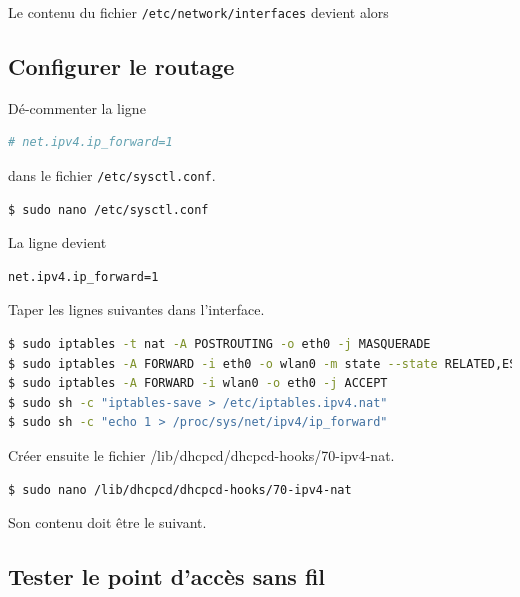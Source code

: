 \documentclass[11pt]{article}
\begin{document}
Le contenu du fichier \lstinline{/etc/network/interfaces} devient alors



\subsection{Configurer le routage}

Dé-commenter la ligne 
\begin{lstlisting}[language=bash]
# net.ipv4.ip_forward=1
\end{lstlisting}
dans le fichier \lstinline{/etc/sysctl.conf}.

\begin{lstlisting}[language=bash]
$ sudo nano /etc/sysctl.conf
\end{lstlisting}

La ligne devient
\begin{lstlisting}[language=bash]
net.ipv4.ip_forward=1
\end{lstlisting}

Taper les lignes suivantes dans l'interface.

\begin{lstlisting}[language=bash]
$ sudo iptables -t nat -A POSTROUTING -o eth0 -j MASQUERADE
$ sudo iptables -A FORWARD -i eth0 -o wlan0 -m state --state RELATED,ESTABLISHED -j ACCEPT
$ sudo iptables -A FORWARD -i wlan0 -o eth0 -j ACCEPT
$ sudo sh -c "iptables-save > /etc/iptables.ipv4.nat"
$ sudo sh -c "echo 1 > /proc/sys/net/ipv4/ip_forward"
\end{lstlisting}

Créer ensuite le fichier {/lib/dhcpcd/dhcpcd-hooks/70-ipv4-nat}.
\begin{lstlisting}[language=bash]
$ sudo nano /lib/dhcpcd/dhcpcd-hooks/70-ipv4-nat
\end{lstlisting}

Son contenu doit être le suivant.



\subsection{Tester le point d'accès sans fil}

\end{document}
